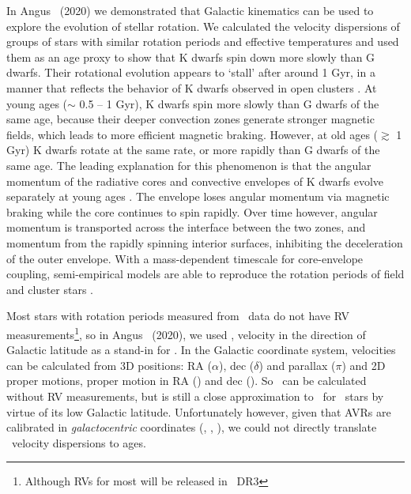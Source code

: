 In Angus \etal\ (2020) we demonstrated that Galactic kinematics can be used to
explore the evolution of stellar rotation.
We calculated the velocity dispersions of groups of stars with similar
rotation periods and effective temperatures and used them as an age proxy to
show that K dwarfs spin down more slowly than G dwarfs.
Their rotational evolution appears to `stall' after around 1 Gyr, in a manner
that reflects the behavior of K dwarfs observed in open clusters
\citep{curtis2019}.
At young ages ($\sim$ 0.5 -- 1 Gyr), K dwarfs spin more slowly than G dwarfs of
the same age, because their deeper convection zones generate stronger magnetic
fields, which leads to more efficient magnetic braking.
However, at old ages ($\gtrsim$ 1 Gyr) K dwarfs rotate at the same rate, or
more rapidly than G dwarfs of the same age.
The leading explanation for this phenomenon is that the angular momentum of
the radiative cores and convective envelopes of K dwarfs evolve separately at
young ages \citep{spada2019}.
The envelope loses angular momentum via magnetic braking while the core
continues to spin rapidly.
Over time however, angular momentum is transported across the interface
between the two zones, and momentum from the rapidly spinning interior
surfaces, inhibiting the deceleration of the outer envelope.
With a mass-dependent timescale for core-envelope coupling, semi-empirical
models are able to reproduce the rotation periods of field and cluster stars
\citep[][Angus \etal, 2020]{spada2019, curtis2019}.

Most stars with rotation periods measured from \kepler\ data do not have RV
measurements\footnote{Although RVs for most will be released in \gaia\ DR3},
so in Angus \etal\ (2020), we used \vb, velocity in the direction of Galactic
latitude as a stand-in for \vz.
In the Galactic coordinate system, velocities can be calculated from 3D
positions: RA ($\alpha$), dec ($\delta$) and parallax ($\pi$) and 2D proper
motions, proper motion in RA (\mura) and dec (\mudec).
So \vb\ can be calculated without RV measurements, but is still a close
approximation to \vz\ for \kepler\ stars by virtue of its low Galactic
latitude.
Unfortunately however, given that AVRs are calibrated in {\it galactocentric}
coordinates (\vx, \vy, \vz), we could not directly translate \vb\ velocity
dispersions to ages.

